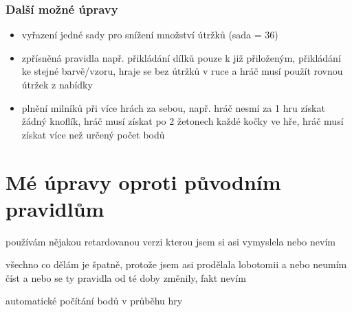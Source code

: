 \subsubsection*{Další možné úpravy}
\begin{itemize}
    \item vyřazení jedné sady pro snížení množství útržků (sada = 36)
    \item zpřísněná pravidla např. přikládání dílků pouze k již přiloženým, přikládání ke stejné barvě/vzoru, hraje se bez útržků v ruce a hráč musí použít rovnou útržek z nabídky
    \item plnění milníků při více hrách za sebou, např. hráč nesmí za 1 hru získat žádný knoflík, hráč musí získat po 2 žetonech každé kočky ve hře, hráč musí získat více než určený počet bodů
\end{itemize}

\section{Mé úpravy oproti původním pravidlům}

používám nějakou retardovanou verzi kterou jsem si asi vymyslela nebo nevím

všechno co dělám je špatně, protože jsem asi prodělala lobotomii a nebo neumím číst a nebo se ty pravidla od té doby změnily, fakt nevím

automatické počítání bodů v průběhu hry 

